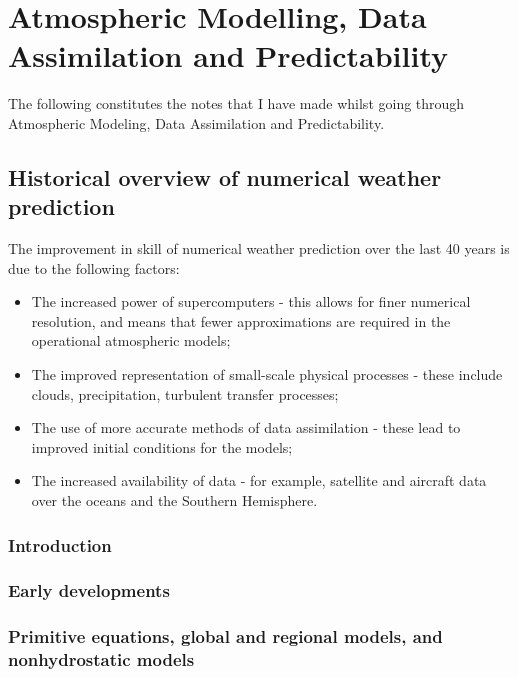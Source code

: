 \chapter{Atmospheric Modelling, Data Assimilation and Predictability}
\label{ch:kalnay}

The following constitutes the notes that I have made whilst going through Atmospheric Modeling, Data Assimilation and Predictability\citep{kalnay_atmospheric_2003}.

\section{Historical overview of numerical weather prediction}
\label{sec:kalnay:historical_overview}

The improvement in skill of numerical weather prediction over the last 40 years is due to the following factors:
\begin{itemize}
\item The increased power of supercomputers - this allows for finer numerical resolution, and means that fewer approximations are required in the operational atmospheric models;
\item The improved representation of small-scale physical processes - these include clouds, precipitation, turbulent transfer processes;
\item The use of more accurate methods of data assimilation - these lead to improved initial conditions for the models;
\item The increased availability of data - for example, satellite and aircraft data over the oceans and the Southern Hemisphere. 
\end{itemize}

\subsection{Introduction}
\label{subs:historical_overview:introduction}

\subsection{Early developments}
\label{subs:historical_overview:early_developments}

\subsection{Primitive equations, global and regional models, and nonhydrostatic models}
\label{subs:historical_overview:primitive_equations}

